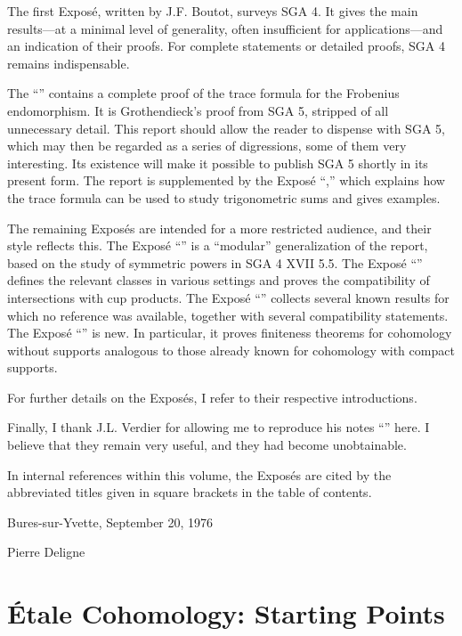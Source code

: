 \documentclass[12pt,oneside,english]{smfbook}
\newcommand\blfootnote[1]{%
  \begingroup
  \renewcommand\thefootnote{}%
  \footnotetext{#1}%
  \endgroup
}
\begin{document}
The first Exposé, written by J.F. Boutot, surveys SGA 4. It gives the main results---at a minimal level of generality, often insufficient for applications---and an indication of their proofs. For complete statements or detailed proofs, SGA 4 remains indispensable.

The ``'' contains a complete proof of the trace formula for the Frobenius endomorphism. It is Grothendieck's proof from SGA 5, stripped of all unnecessary detail. This report should allow the reader to dispense with SGA 5, which may then be regarded as a series of digressions, some of them very interesting. Its existence will make it possible to publish SGA 5 shortly in its present form. The report is supplemented by the Exposé ``,'' which explains how the trace formula can be used to study trigonometric sums and gives examples.

The remaining Exposés are intended for a more restricted audience, and their style reflects this. The Exposé ``'' is a ``modular'' generalization of the report, based on the study of symmetric powers in SGA 4 XVII 5.5. The Exposé ``'' defines the relevant classes in various settings and proves the compatibility of intersections with cup products. The Exposé ``'' collects several known results for which no reference was available, together with several compatibility statements. The Exposé ``'' is new. In particular, it proves finiteness theorems for cohomology without supports analogous to those already known for cohomology with compact supports.

For further details on the Exposés, I refer to their respective introductions.

Finally, I thank J.L. Verdier for allowing me to reproduce his notes ``'' here. I believe that they remain very useful, and they had become unobtainable.

In internal references within this volume, the Exposés are cited by the abbreviated titles given in square brackets in the table of contents.

\vspace{20pt}
Bures-sur-Yvette, September 20, 1976

\vspace{5pt}
Pierre Deligne
\clearpage
\tableofcontents

\mainmatter
\chapter{Étale Cohomology: Starting Points}\label{I}
\blfootnote{by P.\ Deligne, notes by J.F.\ Boutot}
\end{document}
